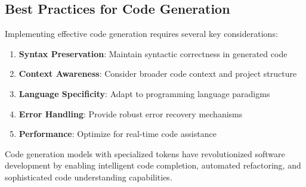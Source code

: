\subsection{Best Practices for Code Generation}

Implementing effective code generation requires several key considerations:

\begin{enumerate}
\item \textbf{Syntax Preservation}: Maintain syntactic correctness in generated code
\item \textbf{Context Awareness}: Consider broader code context and project structure
\item \textbf{Language Specificity}: Adapt to programming language paradigms
\item \textbf{Error Handling}: Provide robust error recovery mechanisms
\item \textbf{Performance}: Optimize for real-time code assistance
\end{enumerate}

Code generation models with specialized tokens have revolutionized software development by enabling intelligent code completion, automated refactoring, and sophisticated code understanding capabilities.